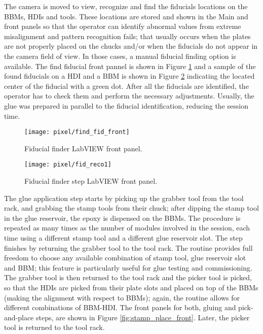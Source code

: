 The camera is moved to view, recognize and find the fiducials locations on the BBMs, HDIs and tools. These locations are stored and shown in the Main and  front panels so that the operator can identify abnormal values from extreme misalignment and pattern recognition fails; that usually occurs when the plates are not properly placed on the chucks and/or when the fiducials do not appear in the camera field of view. In those cases, a manual fiducial finding option is available. The find fiducial front pannel is shown in Figure \ref{fig:find_fid_front} and a sample of the found fiducials on a HDI and a BBM is shown in Figure \ref{fig:fid_reco} indicating the located center of the fiducial with a green dot. After all the fiducials are identified, the operator has to check them and perform the necessary adjustments. Usually, the glue was prepared in parallel to the fiducial identification, reducing the session time.  

\begin{landscape}
\begin{figure}[h]
\begin{center}
    \vspace{-2.9cm}
    \hspace{-1cm}
    \texttt{[image: pixel/find\_fid\_front]}
    \caption[Fiducial finder LabVIEW front panel]{Fiducial finder LabVIEW front panel.}\label{fig:find_fid_front}
    \vspace{-2cm}
    \hspace{-2cm}
\end{center}
\end{figure}
\end{landscape}


\begin{figure}[h]
\begin{center}
  \texttt{[image: pixel/fid\_reco1]}
 \caption[Fiducial finder step LabVIEW front panel]{Fiducial finder step LabVIEW front panel.}\label{fig:fid_reco}
\end{center}
\end{figure}

The glue application step starts by picking up the grabber tool from the tool rack, and grabbing the stamp tools from their chuck; after dipping the stamp tool in the glue reservoir, the epoxy is dispensed on the BBMs. The procedure is repeated as many times as the number of modules involved in the session, each time using a different stamp tool and a different glue reservoir slot. The step finishes by returning the grabber tool to the tool rack. The routine provides full freedom to choose any available combination of stamp tool, glue reservoir slot and BBM; this feature is particularly useful for glue testing and commissioning. The grabber tool is then returned to the tool rack and the picker tool is picked, so that the HDIs are picked from their plate slots and placed on top of the BBMs (making the alignment with respect to BBMs); again, the routine allows for different combinations of BBM-HDI. The front panels for both, gluing and pick-and-place steps, are shown in Figure \ref{fig:stamp_place_front}. Later, the picker tool is returned to the tool rack.

